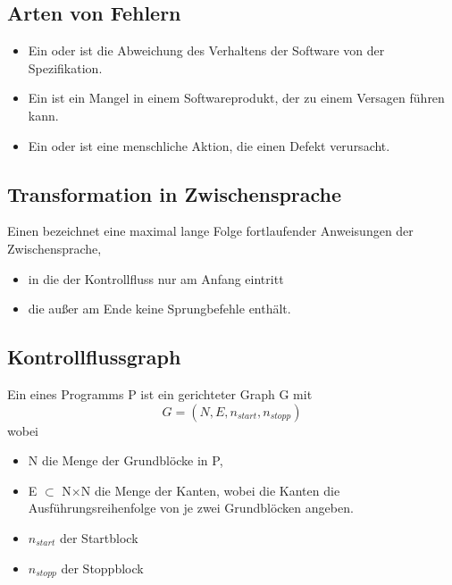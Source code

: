 \subsection{Arten von Fehlern}
\begin{itemize}
    \item Ein  oder  ist die Abweichung des Verhaltens der Software von der Spezifikation.
    \item Ein  ist ein Mangel in einem Softwareprodukt, der zu einem Versagen führen kann.
    \item Ein  oder  ist eine menschliche Aktion, die einen Defekt verursacht.
\end{itemize}

\subsection{Transformation in Zwischensprache}

Einen  bezeichnet eine maximal lange Folge fortlaufender Anweisungen der Zwischensprache,
\begin{itemize}
    \item in die der Kontrollfluss nur am Anfang eintritt
    \item die außer am Ende keine Sprungbefehle enthält.
\end{itemize}

\newpage

\subsection{Kontrollflussgraph}
Ein  eines Programms P ist ein gerichteter Graph G mit 
\[G=(N,E,n_{start},n_{stopp})\]
wobei
\begin{itemize}
    \item N die Menge der Grundblöcke in P,
    \item E $\subset$ N$\times$N die Menge der Kanten, wobei die Kanten die Ausführungsreihenfolge von je zwei Grundblöcken angeben.
    \item $n_{start}$ der Startblock
    \item $n_{stopp}$ der Stoppblock
\end{itemize}

\newpage


